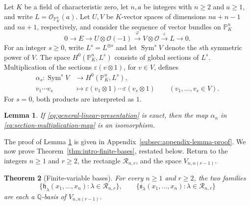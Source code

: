 \documentclass[12pt,reqno,a4paper]{amsart}
\numberwithin{equation}{section}
\numberwithin{figure}{section}
\theoremstyle{plain}
\newtheorem{theorem}{Theorem}[section]
\newtheorem{lemma}[theorem]{Lemma}
\theoremstyle{definition}
\begin{document}
Let $K$ be a field of characteristic zero, let $n,a$ be integers with $n\geq2$ and
$a\geq1$, and write $L=\mathcal O_{\mathbb P^n_K}(a)$.
Let $U,V$ be $K$-vector spaces of dimensions $na+n-1$ and
$na+1$, respectively, and consider the sequence of vector bundles
on $\mathbb P^n_K$
\begin{equation}\label{eq:general-linear-presentation}
 0\longrightarrow E\longrightarrow U\otimes\mathcal O(-1)
 \xrightarrow{\varphi}V\otimes\mathcal O
 \xrightarrow{\varepsilon}L\longrightarrow0.
\end{equation}
For an integer $s\geq0$, write $L^s=L^{\otimes s}$ and let
$\operatorname{Sym}^sV$ denote the $s$th symmetric power of $V$.
The space $H^0(\mathbb P^n_K,L^s)$ consists of global sections of
$L^s$. Multiplication of the sections $\varepsilon(v\otimes1)$, for $v\in V$,
defines
\begin{equation}\label{eq:section-multiplication-map}
 \begin{aligned}
 \alpha_s:\operatorname{Sym}^sV
     &\longrightarrow H^0(\mathbb P^n_K,L^s),\\
 v_1\cdots v_s&\longmapsto
        \varepsilon(v_1\otimes1)\cdots\varepsilon(v_s\otimes1)
        \qquad(v_1,\ldots,v_s\in V).
 \end{aligned}
\end{equation}
For $s=0$, both products are interpreted as $1$.

\begin{lemma}\label{lem:linear-presentation-multiplication}
If \eqref{eq:general-linear-presentation} is exact, then the map
$\alpha_n$ in \eqref{eq:section-multiplication-map} is an isomorphism.
\end{lemma}

The proof of Lemma \ref{lem:linear-presentation-multiplication} is given in Appendix~\ref{subsec:appendix-lemma-proof}. We now prove Theorem~\ref{thm:intro-finite-bases}, restated below.
Return to the integers $n\geq1$ and $r\geq2$,
the rectangle $\mathcal R_{n,r}$, and the space $V_{n,n(r-1)}$.

\begin{theorem}[Finite-variable bases]\label{thm:finite-variable-bases}
For every $n\geq1$ and $r\geq2$, the two families
\[
 \{\mathfrak h_\lambda(x_1,\ldots,x_n):\lambda\in\mathcal R_{n,r}\},
 \qquad
 \{\mathfrak s_\lambda(x_1,\ldots,x_n):\lambda\in\mathcal R_{n,r}\}
\]
are each a $\mathbb Q$-basis of $V_{n,n(r-1)}$.
\end{theorem}
\end{document}
